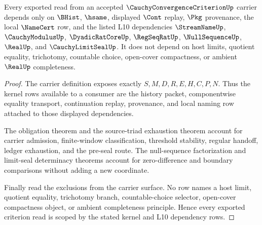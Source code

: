 \begin{theorem}
\label{thm:cauchy-convergence-criterion-kernel-dependency-scope}
Every exported read from an accepted $\CauchyConvergenceCriterionUp$ carrier depends only on $\BHist$, $\hsame$, displayed $\Cont$ replay, $\Pkg$ provenance, the local $\NameCert$ row, and the listed L10 dependencies $\StreamNameUp$, $\CauchyModulusUp$, $\DyadicRatCoreUp$, $\RegSeqRatUp$, $\NullSequenceUp$, $\RealUp$, and $\CauchyLimitSealUp$. It does not depend on host limits, quotient equality, trichotomy, countable choice, open-cover compactness, or ambient $\RealUp$ completeness.
\end{theorem}
\begin{proof}
The carrier definition exposes exactly $S,M,D,R,E,H,C,P,N$. Thus the kernel rows available to a consumer are the history packet, componentwise equality transport, continuation replay, provenance, and local naming row attached to those displayed dependencies.

The obligation theorem and the source-triad exhaustion theorem account for carrier admission, finite-window classification, threshold stability, regular handoff, ledger exhaustion, and the pre-seal route. The null-sequence factorization and limit-seal determinacy theorems account for zero-difference and boundary comparisons without adding a new coordinate.

Finally read the exclusions from the carrier surface. No row names a host limit, quotient equality, trichotomy branch, countable-choice selector, open-cover compactness object, or ambient completeness principle. Hence every exported criterion read is scoped by the stated kernel and L10 dependency rows.
\end{proof}

